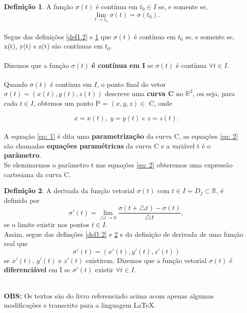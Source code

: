 \documentclass[12pt, a4paper]{article}
\theoremstyle{definition} %
\newtheorem{defi}{Definição}[section]%
\begin{document}
	\begin{defi}\label{def1.3}
	A função $\sigma(t)$ é contínua em $t_0 \in I$ se, e somente se,
	$$\lim_{t \to t_0}\sigma(t) = \sigma(t_0).$$
	\\
	Segue das definições \ref{def1.2} e \ref{def1.3} que $\sigma(t)$ é contínua em $t_0$ se, e somente
	se, x(t), y(t) e z(t) são contínuas em $t_0$.
	\\
	\\
	Dizemos que a função $\sigma(t)$ \textbf{é contínua em I} se $\sigma(t)$ é contínua $\forall t 
	\in I.$
	\\
	\\
	Quando $\sigma(t)$ é contínua em $I$, o ponto final do vetor $\sigma(t) = (x(t),y(t),z(t))$ descreve 
	uma \textbf{curva C} no $\mathds{R}^3$, ou seja, para cada $t \in 	I$, obtemos um ponto 
	P = $(x,y,z)
	 \in$ C, onde
	 
	\begin{equation}
	x = x(t), \; y = y(t) \; e \;z = z(t).
	\label{eq: 2}
	\end{equation}
	\\
	A equação \ref{eq: 1} é dita uma \textbf{parametrização} da curva C, as equações \ref{eq: 2} são
	chamadas \textbf{equações paramétricas} da curva C e a variável t é o  \textbf{parâmetro}.
	\\
	Se eleminarmos o parâmetro t nas equações \ref{eq: 2}	 obteremos uma expressão cartesiana da curva
	C.
	
	 \end{defi}

	\begin{defi}\label{def1.4}
	A derivada da função vetorial $\sigma(t)$ com $t \in I= D_f \subset \mathds{R}$, é definida por  
	$$\sigma'(t) = \lim_{\bigtriangleup t\to 0}\frac{\sigma(t + \bigtriangleup t) - \sigma(t)}
	{\bigtriangleup t},$$  
	se o limite existir nos pontos $t \in I$.
	\\	
	Assim, segue das definções \ref{def1.2} e \ref{def1.4} e da definição de derivada de uma função real
	que
	$$\sigma'(t)=(x'(t),y'(t),z'(t))$$
	se $x'(t)$, $y'(t)$ e $z'(t)$ existirem.
	Dizemos que a função vetorial $\sigma(t)$ é \textbf{diferenciável} em I se $\sigma'(t)$ existir 
	$\forall t \in I$.
	\end{defi}
	
	\newpage	
	\\
	\textbf{OBS:} Os textos são do livro referenciado acima acom apenas algumas modificações e 
	transcrito para a linguagem \LaTeX.

	
\end{document}
